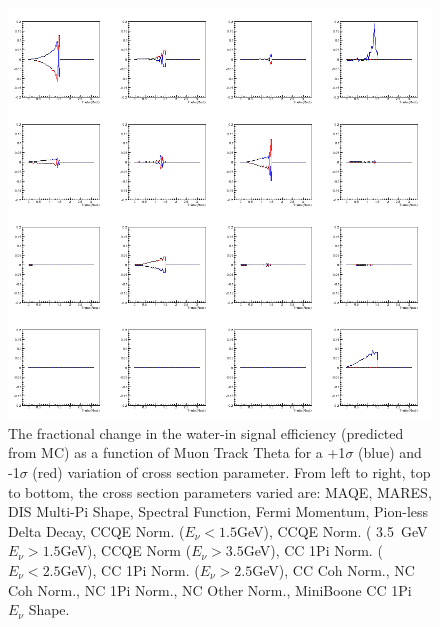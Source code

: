 \begin{figure}[H]
\centering
\includegraphics[width=5in]{Figures/TN100Plots/c_8_0.png}
\caption{The fractional change in the water-in signal efficiency (predicted from MC) as a function of Muon Track Theta for a +1$\sigma$ (blue) and -1$\sigma$ (red) variation of cross section parameter. From left to right, top to bottom, the cross section parameters varied are: MAQE, MARES, DIS Multi-Pi Shape, Spectral Function, Fermi Momentum, Pion-less Delta Decay, CCQE Norm. ($E_\nu < 1.5$GeV), CCQE Norm. ( 3.5~GeV$E_\nu>1.5$GeV), CCQE Norm ($E_\nu > 3.5$GeV), CC 1Pi Norm. ($E_\nu < 2.5$GeV), CC 1Pi Norm. ($E_\nu > 2.5$GeV), CC Coh Norm., NC Coh Norm., NC 1Pi Norm., NC Other Norm., MiniBoone CC 1Pi $E_\nu$ Shape.}
\label{fig:xsvarTwE}
\end{figure}

